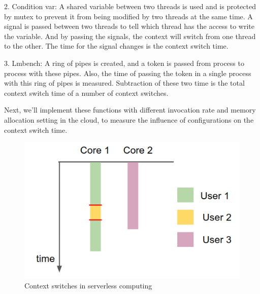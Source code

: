 	2. Condition var\cite{cs-web}: A shared variable between two threads is used and is protected by mutex to prevent it from being modified by two threads at the same time.
		      A signal is passed between two threads to tell which thread has the access to write the variable.
			  And by passing the signals, the context will switch from one thread to the other. 
			  The time for the signal changes is the context switch time.
	
	3.  Lmbench\cite{cs-lmbench}: A ring of pipes is created, and a token is passed from process to process with these pipes. 
	          Also, the time of passing the token in a single process with this ring of pipes is measured. 
			  Subtraction of these two time is the total context switch time of a number of context switches.

	Next, we'll implement these functions with different invocation rate and memory allocation setting in the cloud,
	to measure the influence of configurations on the context switch time.
	
\begin{figure}
	\centering
	\includegraphics[width=\linewidth]{./figure/cxt_cloud.png}
	\caption{Context switches in serverless computing}
	\label{fig:cloud}
\end{figure}

